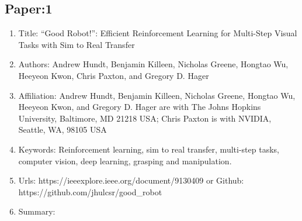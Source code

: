 \hypertarget{paper1}{%
\subsection{Paper:1}\label{paper1}}

\begin{enumerate}
\def\labelenumi{\arabic{enumi}.}
\item
  Title: ``Good Robot!'': Efficient Reinforcement Learning for
  Multi-Step Visual Tasks with Sim to Real Transfer
\item
  Authors: Andrew Hundt, Benjamin Killeen, Nicholas Greene, Hongtao Wu,
  Heeyeon Kwon, Chris Paxton, and Gregory D. Hager
\item
  Affiliation: Andrew Hundt, Benjamin Killeen, Nicholas Greene, Hongtao
  Wu, Heeyeon Kwon, and Gregory D. Hager are with The Johns Hopkins
  University, Baltimore, MD 21218 USA; Chris Paxton is with NVIDIA,
  Seattle, WA, 98105 USA
\item
  Keywords: Reinforcement learning, sim to real transfer, multi-step
  tasks, computer vision, deep learning, grasping and manipulation.
\item
  Urls: https://ieeexplore.ieee.org/document/9130409 or Github:
  https://github.com/jhulcsr/good\_robot
\item
  Summary:
\end{enumerate}

